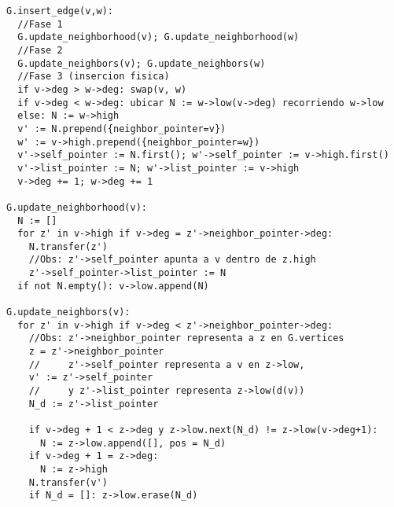 \documentclass[%
    a4paper,%
    fontsize=12pt,%
    DIV=12,
    twoside,%
    openright,%
    titlepage=true,%
    headsepline,%
    toc=bibliography,%
    parskip=half,%
    cleardoublepage=empty,%
    headings=big,%
]{scrbook}
\makeatletter
\newcommand{\Code}[2][]{\lstinline[basicstyle={\ttfamily},#1]@#2@}
\makeatother
\begin{document}
\begin{lstlisting}[caption={Implementación de \Code{insert_edge}.},float=ht,label={lst:pseudo:G.insert_edge}]
G.insert_edge(v,w):
  //Fase 1
  G.update_neighborhood(v); G.update_neighborhood(w)
  //Fase 2
  G.update_neighbors(v); G.update_neighbors(w)
  //Fase 3 (insercion fisica)
  if v->deg > w->deg: swap(v, w)
  if v->deg < w->deg: ubicar N := w->low(v->deg) recorriendo w->low
  else: N := w->high
  v' := N.prepend({neighbor_pointer=v})
  w' := v->high.prepend({neighbor_pointer=w})
  v'->self_pointer := N.first(); w'->self_pointer := v->high.first()
  v'->list_pointer := N; w'->list_pointer := v->high
  v->deg += 1; w->deg += 1

G.update_neighborhood(v):
  N := []
  for z' in v->high if v->deg = z'->neighbor_pointer->deg:
    N.transfer(z')
    //Obs: z'->self_pointer apunta a v dentro de z.high
    z'->self_pointer->list_pointer := N
  if not N.empty(): v->low.append(N)

G.update_neighbors(v):
  for z' in v->high if v->deg < z'->neighbor_pointer->deg:
    //Obs: z'->neighbor_pointer representa a z en G.vertices
    z = z'->neighbor_pointer
    //     z'->self_pointer representa a v en z->low,
    v' := z'->self_pointer
    //     y z'->list_pointer representa z->low(d(v))
    N_d := z'->list_pointer
     
    if v->deg + 1 < z->deg y z->low.next(N_d) != z->low(v->deg+1):
      N := z->low.append([], pos = N_d)
    if v->deg + 1 = z->deg:
      N := z->high
    N.transfer(v')
    if N_d = []: z->low.erase(N_d)
\end{lstlisting}

\end{document}
